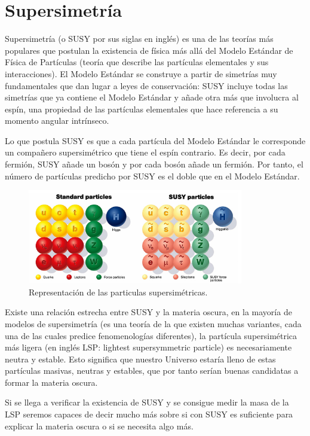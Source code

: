 \section{Supersimetría}

Supersimetría (o SUSY por sus siglas en inglés) es una de las teorías más populares que postulan la existencia de física más allá del Modelo Estándar de Física de Partículas (teoría que describe las partículas elementales y sus interacciones). El Modelo Estándar se construye a partir de simetrías muy fundamentales que dan lugar a leyes de conservación: SUSY incluye todas las simetrías que ya contiene el Modelo Estándar y añade otra más que involucra al espín, una propiedad de las partículas elementales que hace referencia a su momento angular intrínseco.

Lo que postula SUSY es que a cada partícula del Modelo Estándar le corresponde un compañero supersimétrico que tiene el espín contrario. Es decir, por cada fermión, SUSY añade un bosón y por cada bosón añade un fermión. Por tanto, el número de partículas predicho por SUSY es el doble que en el Modelo Estándar.

\begin{figure}
    \centering
    \includegraphics[width=0.84\textwidth]{ANTECEDENTES/supersimetrias.png}
    \caption{Representación de las particulas supersimétricas.}
    \label{fig:cms_interaction}
\end{figure}

Existe una relación estrecha entre SUSY y la materia oscura, en la mayoría de modelos de supersimetría (es una teoría de la que existen muchas variantes, cada una de las cuales predice fenomenologías diferentes), la partícula supersimétrica más ligera (en inglés LSP: lightest supersymmetric particle) es necesariamente neutra y estable. Esto significa que nuestro Universo estaría lleno de estas partículas masivas, neutras y estables, que por tanto serían buenas candidatas a formar la materia oscura.

Si se llega a verificar la existencia de SUSY y se consigue medir la masa de la LSP seremos capaces de decir mucho más sobre si con SUSY es suficiente para explicar la materia oscura o si se necesita algo más.






















